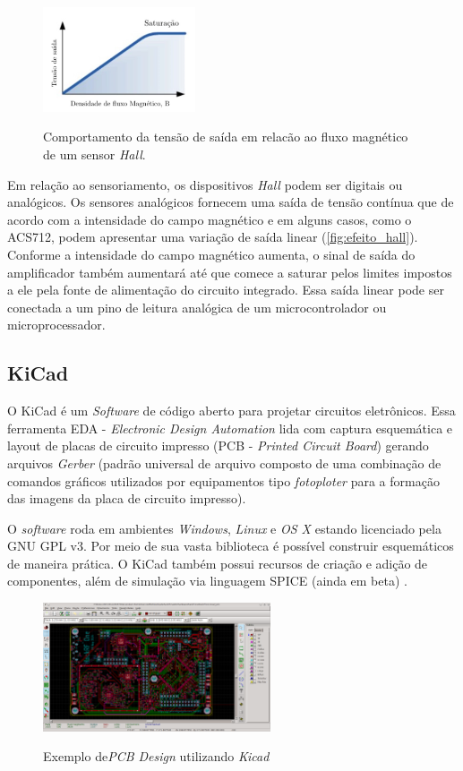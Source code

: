 \begin{figure}[H]
	\centering
	\caption{Comportamento da tensão de saída em relacão ao fluxo magnético de um sensor \textit{Hall}.}
	\includegraphics[width=0.4\textwidth]{figuras/grafico_hall.jpg}
	\label{fig:efeito_hall}
\end{figure} 

Em relação ao sensoriamento, os dispositivos \textit{Hall} podem ser digitais ou analógicos. Os sensores analógicos fornecem uma saída de tensão contínua que de acordo com a intensidade do campo magnético e em alguns casos, como o ACS712, podem apresentar uma variação de saída linear (\autoref{fig:efeito_hall}). Conforme a intensidade do campo magnético aumenta, o sinal de saída do amplificador também aumentará até que comece a saturar pelos limites impostos a ele pela fonte de alimentação do circuito integrado. Essa saída linear pode ser conectada a um pino de leitura analógica de um microcontrolador ou microprocessador.

\subsection{KiCad}

O KiCad é um \textit{Software} de código aberto para projetar circuitos eletrônicos. Essa ferramenta EDA - \textit{Electronic Design Automation} lida com captura esquemática e layout de placas de circuito impresso (PCB - \textit{Printed Circuit Board}) gerando arquivos \textit{Gerber} (padrão universal de arquivo composto de uma combinação de comandos gráficos utilizados por equipamentos tipo \textit{fotoploter} para a formação das imagens da placa de circuito impresso).

O \textit{software} roda em ambientes \textit{Windows}, \textit{Linux} e \textit{OS X} estando licenciado pela GNU GPL v3. Por meio de sua vasta biblioteca é possível construir esquemáticos de maneira prática. O KiCad também possui recursos de criação e adição de componentes, além de simulação via linguagem SPICE (ainda em beta) \cite{Kicad}. 

\begin{figure}[H]
	\centering
	\caption{Exemplo de\textit{PCB Design} utilizando \textit{Kicad}}
	\includegraphics[width=0.6\textwidth]{figuras/kicad_pcbnew.png}
	\label{fig:kicad_pcbnew}
\end{figure} 


